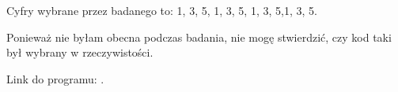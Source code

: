 \documentclass[licencjacka]{kdypl}
\begin{document}
Cyfry wybrane przez badanego to: 1, 3, 5, 1, 3, 5, 1, 3, 5,1, 3, 5.

Ponieważ nie byłam obecna podczas badania, nie mogę stwierdzić, czy kod taki był wybrany w rzeczywistości.

Link do programu: \url{}. 









%

%
%

%
\end{document}
